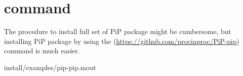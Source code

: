 
\section{ command}

The procedure to install full set of PiP package might be cumbersome,
but installing PiP package by using the 
(\url{https://github.com/procinproc/PiP-pip}) command is much easier. 


                {install/examples/pip-pip.mout}
